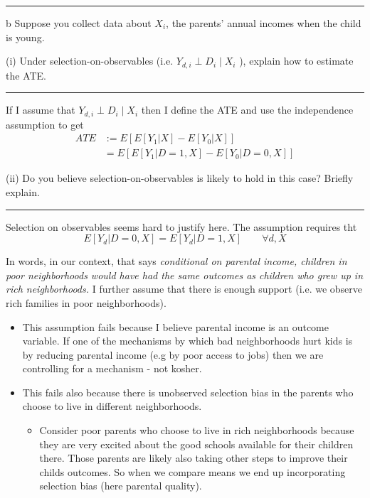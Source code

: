 \documentclass{article}
\begin{document}
\rule[0.5ex]{1\columnwidth}{1pt}

\begin{problem}{b}
Suppose you collect data about $X_{i}$, the parents' annual incomes
when the child is young. 
\end{problem}


(i) Under selection-on-observables (i.e. $Y_{d,i}\perp D_{i}\mid X_{i}$
), explain how to estimate the ATE. 

\rule[0.5ex]{1\columnwidth}{1pt}

If I assume that $Y_{d,i}\perp D_{i}\mid X_{i}$ then I define the
ATE and use the independence assumption to get
\begin{align*}
ATE & :=E\left[E\left[Y_{1}|X\right]-E\left[Y_{0}|X\right]\right]\\
 & =E\left[E\left[Y_{1}|D=1,X\right]-E\left[Y_{0}|D=0,X\right]\right]
\end{align*}

(ii) Do you believe selection-on-observables is likely to hold in
this case? Briefly explain. 

\rule[0.5ex]{1\columnwidth}{1pt}

Selection on observables seems hard to justify here. The assumption
requires tht 
\[
E\left[Y_{d}|D=0,X\right]=E\left[Y_{d}|D=1,X\right]\qquad\forall d,X
\]

In words, in our context, that says \emph{conditional on parental
income, children in poor neighborhoods would have had the same outcomes
as children who grew up in rich neighborhoods. }I further assume that
there is enough support (i.e. we observe rich families in poor neighborhoods). 
\begin{itemize}
\item This assumption fails because I believe parental income is an outcome
variable. If one of the mechanisms by which bad neighborhoods hurt
kids is by reducing parental income (e.g by poor access to jobs) then
we are controlling for a mechanism - not kosher.
\item This fails also because there is unobserved selection bias in the
parents who choose to live in different neighborhoods. 
\begin{itemize}
\item Consider poor parents who choose to live in rich neighborhoods because
they are very excited about the good schools available for their children
there. Those parents are likely also taking other steps to improve
their childs outcomes. So when we compare means we end up incorporating
selection bias (here parental quality). 
\end{itemize}
\end{itemize}
\end{document}
